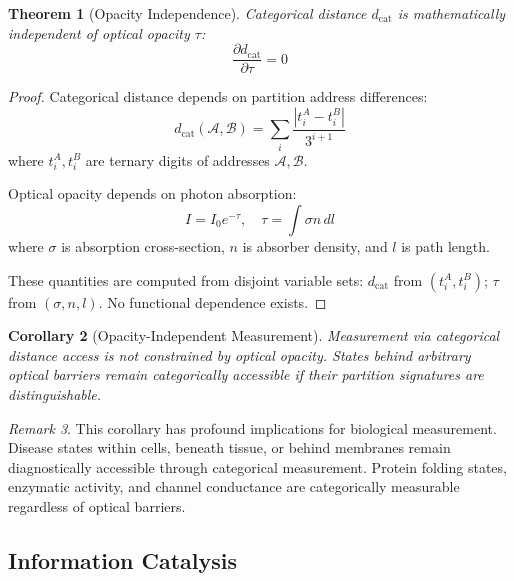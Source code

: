 \documentclass[10pt,twocolumn]{article}
\theoremstyle{plain}
\newtheorem{theorem}{Theorem}[section]
\newtheorem{corollary}[theorem]{Corollary}
\theoremstyle{definition}
\theoremstyle{remark}
\newtheorem{remark}[theorem]{Remark}
\newcommand{\dcat}{d_{\mathrm{cat}}}
\begin{document}
\begin{theorem}[Opacity Independence]
\label{thm:opacity_independence}
Categorical distance $\dcat$ is mathematically independent of optical opacity $\tau$:
\begin{equation}
\frac{\partial \dcat}{\partial \tau} = 0
\label{eq:opacity_indep}
\end{equation}
\end{theorem}

\begin{proof}
Categorical distance depends on partition address differences:
\begin{equation}
\dcat(\mathcal{A}, \mathcal{B}) = \sum_i \frac{|t_i^A - t_i^B|}{3^{i+1}}
\end{equation}
where $t_i^A, t_i^B$ are ternary digits of addresses $\mathcal{A}, \mathcal{B}$.

Optical opacity depends on photon absorption:
\begin{equation}
I = I_0 e^{-\tau}, \quad \tau = \int \sigma n \, dl
\end{equation}
where $\sigma$ is absorption cross-section, $n$ is absorber density, and $l$ is path length.

These quantities are computed from disjoint variable sets: $\dcat$ from $(t_i^A, t_i^B)$; $\tau$ from $(\sigma, n, l)$. No functional dependence exists.
\end{proof}

\begin{corollary}[Opacity-Independent Measurement]
\label{cor:opacity_measurement}
Measurement via categorical distance access is not constrained by optical opacity. States behind arbitrary optical barriers remain categorically accessible if their partition signatures are distinguishable.
\end{corollary}

\begin{remark}
This corollary has profound implications for biological measurement. Disease states within cells, beneath tissue, or behind membranes remain diagnostically accessible through categorical measurement. Protein folding states, enzymatic activity, and channel conductance are categorically measurable regardless of optical barriers.
\end{remark}

\subsection{Information Catalysis}
\end{document}
